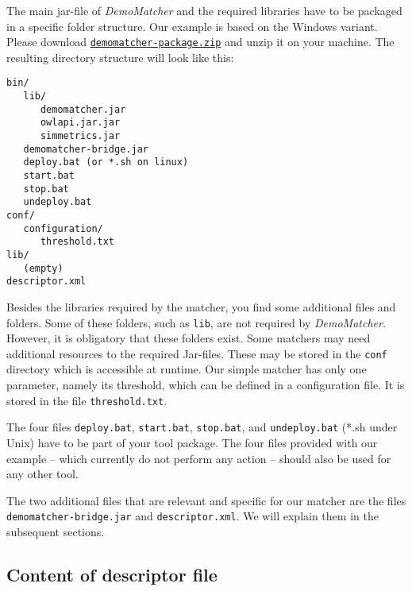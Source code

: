 \documentclass{article}
\def\file#1{\textcolor{grayy}{\texttt{#1}}}
\def\tool#1{\textsl{#1}}
\newcommand\smtt[1]{\texttt{\small #1}}
\begin{document}
The main jar-file of \tool{DemoMatcher} and the required libraries have to be packaged in a specific folder structure. Our example is based on the Windows variant. Please download \href{http://oaei.ontologymatching.org/2011/tutorial/windows/demomatcher-package.zip}{\file{demomatcher-package.zip}} and unzip it on your machine. The resulting directory structure will look like this:

\begin{verbatim}
bin/
   lib/
      demomatcher.jar
      owlapi.jar.jar
      simmetrics.jar
   demomatcher-bridge.jar
   deploy.bat (or *.sh on linux)
   start.bat
   stop.bat
   undeploy.bat
conf/
   configuration/
      threshold.txt
lib/
   (empty)
descriptor.xml  
\end{verbatim}

Besides the libraries required by the matcher, you find some additional files and folders. 
Some of these folders, such as \smtt{lib}, are not required by \tool{DemoMatcher}. 
However, it is obligatory that these folders exist.
Some matchers may need additional resources to the required Jar-files. These may be stored in the \smtt{conf} directory which is accessible at runtime.
Our simple matcher has only one parameter, namely its threshold, which can be defined in a configuration file. It is stored in the file \file{threshold.txt}.

The four files \file{deploy.bat}, \file{start.bat}, \file{stop.bat}, and \file{undeploy.bat} (*.sh under Unix) have to be part of your tool package. The four files provided with our example -- which currently do not perform any action -- should also be used for any other tool. 

The two additional files that are relevant and specific for our matcher are the files \file{demomatcher-bridge.jar} and \file{descriptor.xml}. We will explain them in the subsequent sections.

\subsection{Content of descriptor file}
\label{sec:descriptor}
\end{document}
